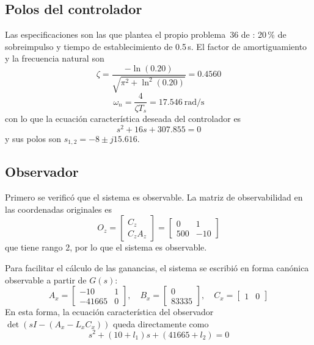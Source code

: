 \documentclass[conference]{IEEEtran}
\begin{document}
\subsection{Polos del controlador}

Las especificaciones son las que plantea el propio problema~36 de \cite{nise}: 20\,\% de sobreimpulso y tiempo de establecimiento de 0.5\,s. El factor de amortiguamiento y la frecuencia natural son
\begin{equation}
\zeta = \frac{-\ln(0.20)}{\sqrt{\pi^2 + \ln^2(0.20)}} = 0.4560
\end{equation}
\begin{equation}
\omega_n = \frac{4}{\zeta T_s} = 17.546~\text{rad/s}
\end{equation}
con lo que la ecuación característica deseada del controlador es
\begin{equation}
s^2 + 16s + 307.855 = 0
\end{equation}
y sus polos son $s_{1,2} = -8 \pm j15.616$.

\subsection{Observador}

Primero se verificó que el sistema es observable. La matriz de observabilidad en las coordenadas originales es
\begin{equation}
O_z = \begin{bmatrix} C_z \\ C_z A_z \end{bmatrix} =
\begin{bmatrix} 0 & 1 \\ 500 & -10 \end{bmatrix}
\end{equation}
que tiene rango 2, por lo que el sistema es observable.

Para facilitar el cálculo de las ganancias, el sistema se escribió en forma canónica observable a partir de $G(s)$:
\begin{equation}
A_x = \begin{bmatrix} -10 & 1 \\ -41665 & 0 \end{bmatrix},\quad
B_x = \begin{bmatrix} 0 \\ 83335 \end{bmatrix},\quad
C_x = \begin{bmatrix} 1 & 0 \end{bmatrix}
\end{equation}
En esta forma, la ecuación característica del observador $\det(sI - (A_x - L_x C_x))$ queda directamente como
\begin{equation}
s^2 + (10 + l_1)s + (41665 + l_2) = 0
\end{equation}
\end{document}

